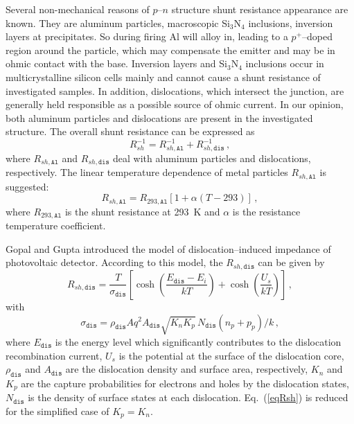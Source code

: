 \documentclass[aip,jap, amsmath,amssymb,reprint]{revtex4-1}
\begin{document}
Several non-mechanical reasons of $p$--$n$ structure shunt resistance appearance are known.\cite{Rsh:Breitenstein}
They are aluminum particles, macroscopic Si$_3$N$_4$ inclusions, inversion layers at precipitates.
So during firing Al will alloy in, leading to a $p^+$--doped region around the particle, which may compensate the emitter and may be in ohmic contact with the
base.
Inversion layers and Si$_3$N$_4$ inclusions occur in multicrystalline silicon cells mainly \cite{Rsh:Breitenstein} and cannot cause a shunt resistance of investigated samples.
In addition, dislocations, which intersect the junction, are generally held responsible as a possible source of ohmic current.\cite{Rsh:Breitenstein,TAT:Gopal,Rsh:Baker}
In our opinion, both aluminum particles and dislocations are present in the investigated structure.
The overall shunt resistance can be expressed as
\begin{equation}
\label{eqRshFull}
R_{sh}^{-1}=R_{sh,\mathtt{Al}}^{-1}+R_{sh,\mathtt{dis}}^{-1}\,,
\end{equation}
where
$R_{sh,\mathtt{Al}}$ and $R_{sh,\mathtt{dis}}$ deal with aluminum particles and dislocations, respectively.
The linear temperature dependence of metal particles $R_{sh,\mathtt{Al}}$ is suggested:
\begin{equation}
\label{eqRshAl}
R_{sh,\mathtt{Al}}=R_{293,\mathtt{Al}}[1+\alpha(T-293)]\,,
\end{equation}
where
$R_{293,\mathtt{Al}}$ is the shunt resistance at 293~K and
$\alpha$ is the resistance temperature coefficient.

Gopal and Gupta \cite{Rsh:Gopal2003,Rsh:Gopal2004} introduced the model of dislocation--induced impedance of photovoltaic detector.
According to this model, the $R_{sh,\mathtt{dis}}$ can be given by
\begin{equation}
\label{eqRsh}
R_{sh,\mathtt{dis}}=\frac{T}{\sigma_{\mathtt{dis}}}\left[\cosh\left(\frac{E_\mathtt{dis}-E_i}{kT}\right)+\cosh\left(\frac{U_s}{kT}\right)\right]\,,
\end{equation}
with
\begin{equation}
\label{eqRdis}
\sigma_{\mathtt{dis}}=\rho_{\mathtt{dis}}Aq^2A_{\mathtt{dis}}\sqrt{K_nK_p}\,N_{\mathtt{dis}}(n_p+p_p)/k\,,
\end{equation}
where
$E_{\mathtt{dis}}$ is the energy level which significantly contributes to the dislocation recombination current,
$U_s$ is the potential at the surface of the dislocation core,
$\rho_{\mathtt{dis}}$ and $A_{\mathtt{dis}}$ are the dislocation density and surface area, respectively,
$K_n$ and $K_p$ are the capture probabilities for electrons and holes by the dislocation states,
$N_{\mathtt{dis}}$ is the density of surface states at each dislocation.
Eq.~(\ref{eqRsh}) is reduced for the simplified case of $K_p=K_n$.
\end{document}
